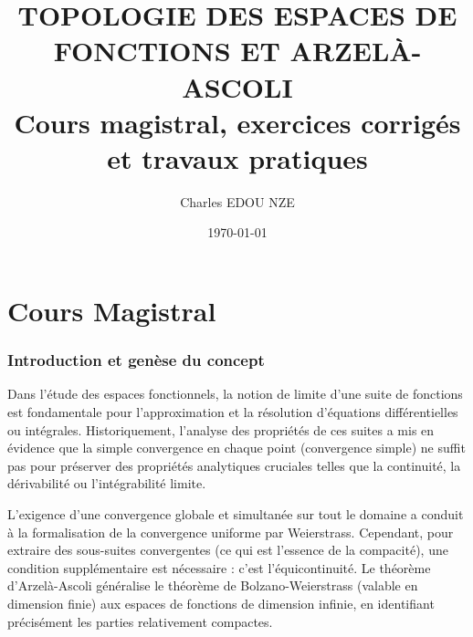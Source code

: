 \documentclass[11pt,a4paper]{article}
\title{\Huge TOPOLOGIE DES ESPACES DE FONCTIONS ET ARZELÀ-ASCOLI \\ \large Cours magistral, exercices corrigés et travaux pratiques}
\author{\Large Charles EDOU NZE}
\date{\today}
\begin{document}
\maketitle
\tableofcontents
\newpage

\part{Cours Magistral}


\section{Introduction et genèse du concept}

Dans l'étude des espaces fonctionnels, la notion de limite d'une suite de fonctions est fondamentale pour l'approximation et la résolution d'équations différentielles ou intégrales. Historiquement, l'analyse des propriétés de ces suites a mis en évidence que la simple convergence en chaque point (convergence simple) ne suffit pas pour préserver des propriétés analytiques cruciales telles que la continuité, la dérivabilité ou l'intégrabilité limite.

L'exigence d'une convergence globale et simultanée sur tout le domaine a conduit à la formalisation de la convergence uniforme par Weierstrass. Cependant, pour extraire des sous-suites convergentes (ce qui est l'essence de la compacité), une condition supplémentaire est nécessaire : c'est l'équicontinuité. Le théorème d'Arzelà-Ascoli généralise le théorème de Bolzano-Weierstrass (valable en dimension finie) aux espaces de fonctions de dimension infinie, en identifiant précisément les parties relativement compactes.

\end{document}
